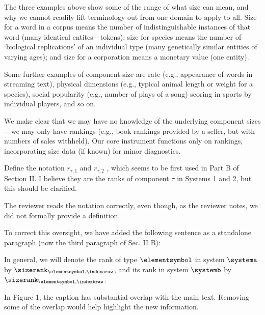 \begin{excerpt}
  The three examples above show some of the range of what size can mean, and why we
  cannot readily lift terminology out from one domain to apply to all.
  Size for a word in a corpus means the number of indistinguishable instances of that word
  (many identical entites---tokens);
  size for species means the number of `biological replications' of an individual type
  (many genetically similar entities of varying ages);
  and
  size for a corporation means a monetary value (one entity).


  Some further examples of component size
  are
  rate (e.g., appearance of words in streaming text),
  physical dimensions (e.g., typical animal length or weight for a species),
  social popularity (e.g., number of plays of a song)
  scoring in sports by individual players,
  and so on.

  We make clear that we may have no knowledge of
  the underlying component sizes---we may only have rankings
  (e.g., book rankings provided by a seller,
  but with numbers of sales withheld).
  Our core instrument functions only on rankings,
  incorporating size data (if known) for minor diagnostics.
\end{excerpt}

\begin{reviewercomment}
  Define the notation $r_{\tau,1}$ and $r_{\tau,2}$ , which seems to be
  first used in Part B of Section II. I believe they are the ranks of
  component $\tau$ in Systems 1 and 2, but this should be clarified.
\end{reviewercomment}

The reviewer reads the notation correctly, even though, as the reviewer notes,
we did not formally provide a definition.

To correct this oversight, we have added the following sentence as
a standalone paragraph (now the third paragraph of Sec. II B):

\begin{excerpt}
In general, we will denote the rank of type
$\elementsymbol$
in system $\systema$
by
$\sizerank_{\elementsymbol,\indexaraw}$,
and
its rank
in system $\systemb$
by
$\sizerank_{\elementsymbol,\indexbraw}$.
\end{excerpt}


\begin{reviewercomment}
  In Figure 1, the caption has substantial overlap with the main
  text. Removing some of the overlap would help highlight the new
  information.
\end{reviewercomment}

